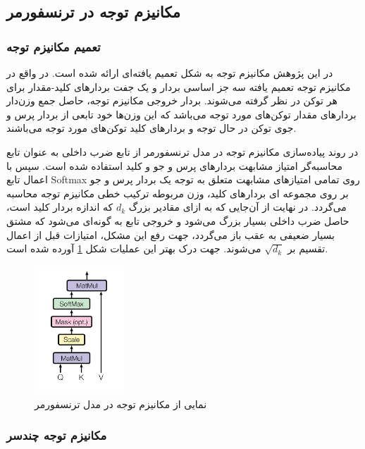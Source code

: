 \subsection{مکانیزم توجه در ترنسفورمر}

\subsubsection{تعمیم مکانیزم توجه}
در این پژوهش مکانیزم توجه به شکل تعمیم یافته‌ای ارائه شده است. در واقع در مکانیزم توجه تعمیم یافته سه جز اساسی بردار 
و یک جفت بردار‌های کلید-مقدار برای هر توکن در نظر گرفته می‌شوند. بردار خروجی مکانیزم توجه، حاصل جمع‌ وزن‌دار بردارهای مقدار  توکن‌های مورد توجه می‌باشد که این وزن‌ها خود تابعی از بردار 
پرس و جوی توکن در حال توجه و بردارهای کلید توکن‌های مورد توجه می‌باشند.

در روند پیاده‌سازی مکانیزم توجه در مدل ترنسفورمر از تابع ضرب داخلی به عنوان تابع محاسبه‌گر امتیاز مشابهت بردار‌های پرس و جو و کلید استفاده شده است.
سپس با اعمال تابع Softmax روی تمامی امتیاز‌های مشابهت متعلق به توجه یک بردار پرس و جو بر روی مجموعه ای بردارهای کلید، وزن مربوطه ترکیب خطی مکانیزم توجه محاسبه می‌گردد. در نهایت از آن‌جایی که به ازای مقادیر بزرگ 
$d_k$
که اندازه بردار کلید است، حاصل ضرب داخلی بسیار بزرگ می‌شود و خروجی تابع 
به گونه‌ای می‌شود که مشتق بسیار ضعیفی به عقب باز‌ می‌گردد، جهت رفع این مشکل، امتیازات قبل از اعمال 
تقسیم بر 
$\sqrt{d_k}$
می‌شوند. جهت درک بهتر این عملیات شکل
\ref{fig:chap3:transformer_attention}
 آورده شده است.

\begin{figure}[h]
	\centering
	\includegraphics[width=0.3\textwidth]{images/chap3/transformer_attention.png}
	\caption{
		نمایی از مکانیزم توجه در مدل ترنسفورمر
		\cite{transformer}
	}
	\label{fig:chap3:transformer_attention}
\end{figure}

\subsubsection{مکانیزم توجه چندسر}

